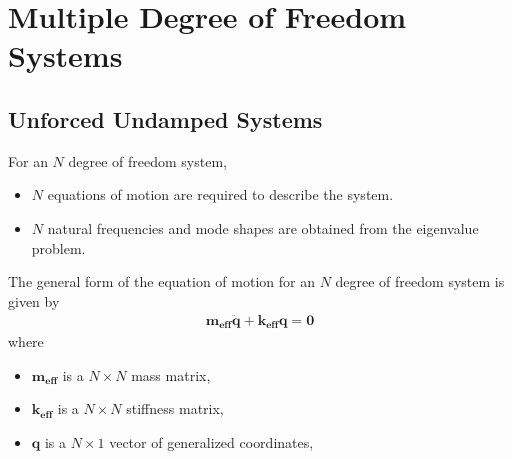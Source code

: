 \section{Multiple Degree of Freedom Systems}
\subsection{Unforced Undamped Systems}
For an $N$ degree of freedom system, 
\begin{itemize}
    \item $N$ equations of motion are required to describe the system.
    \item $N$ natural frequencies and mode shapes are obtained from the eigenvalue problem.
\end{itemize}
The general form of the equation of motion for an $N$ degree of freedom system is given by
\begin{align*}
    \mathbf{m_{\textbf{eff}}} \mathbf{\ddot{q}} + \mathbf{k_{\textbf{eff}}} \mathbf{q} = \mathbf{0}
\end{align*}
where 
\begin{itemize}
    \item $\mathbf{m_{\textbf{eff}}}$ is a $N \times N$ mass matrix,
    \item $\mathbf{k_{\textbf{eff}}}$ is a $N \times N$ stiffness matrix,
    \item $\mathbf{q}$ is a $N \times 1$ vector of generalized coordinates,
\end{itemize}